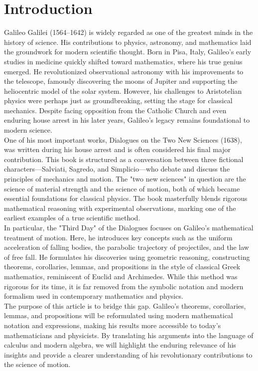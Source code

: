 \section*{Introduction}
\quad	Galileo Galilei (1564–1642) is widely regarded as one of the greatest minds in the history of science. His contributions to physics, astronomy, and mathematics laid the groundwork for modern scientific thought. Born in Pisa, Italy, Galileo’s early studies in medicine quickly shifted toward mathematics, where his true genius emerged. He revolutionized observational astronomy with his improvements to the telescope, famously discovering the moons of Jupiter and supporting the heliocentric model of the solar system. However, his challenges to Aristotelian physics were perhaps just as groundbreaking, setting the stage for classical mechanics. Despite facing opposition from the Catholic Church and even enduring house arrest in his later years, Galileo’s legacy remains foundational to modern science.\\

\quad	One of his most important works, Dialogues on the Two New Sciences (1638), was written during his house arrest and is often considered his final major contribution. This book is structured as a conversation between three fictional characters—Salviati, Sagredo, and Simplicio—who debate and discuss the principles of mechanics and motion. The "two new sciences" in question are the science of material strength and the science of motion, both of which became essential foundations for classical physics. The book masterfully blends rigorous mathematical reasoning with experimental observations, marking one of the earliest examples of a true scientific method.\\

\quad	In particular, the "Third Day" of the Dialogues focuses on Galileo’s mathematical treatment of motion. Here, he introduces key concepts such as the uniform acceleration of falling bodies, the parabolic trajectory of projectiles, and the law of free fall. He formulates his discoveries using geometric reasoning, constructing theorems, corollaries, lemmas, and propositions in the style of classical Greek mathematics, reminiscent of Euclid and Archimedes. While this method was rigorous for its time, it is far removed from the symbolic notation and modern formalism used in contemporary mathematics and physics. \\

\quad	The purpose of this article is to bridge this gap. Galileo’s theorems, corollaries, lemmas, and propositions will be reformulated using modern mathematical notation and expressions, making his results more accessible to today’s mathematicians and physicists. By translating his arguments into the language of calculus and modern algebra, we will highlight the enduring relevance of his insights and provide a clearer understanding of his revolutionary contributions to the science of motion.

